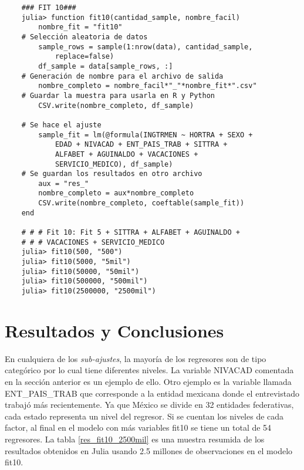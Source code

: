 \begin{verbatim}
	### FIT 10###
	julia> function fit10(cantidad_sample, nombre_facil)
    	nombre_fit = "fit10"
    # Selección aleatoria de datos
    	sample_rows = sample(1:nrow(data), cantidad_sample, 
    		replace=false)
    	df_sample = data[sample_rows, :]
    # Generación de nombre para el archivo de salida
    	nombre_completo = nombre_facil*"_"*nombre_fit*".csv"
    # Guardar la muestra para usarla en R y Python
    	CSV.write(nombre_completo, df_sample)

    # Se hace el ajuste
    	sample_fit = lm(@formula(INGTRMEN ~ HORTRA + SEXO + 
    		EDAD + NIVACAD + ENT_PAIS_TRAB + SITTRA + 
    		ALFABET + AGUINALDO + VACACIONES +
    		SERVICIO_MEDICO), df_sample)
	# Se guardan los resultados en otro archivo
    	aux = "res_"
    	nombre_completo = aux*nombre_completo
    	CSV.write(nombre_completo, coeftable(sample_fit))
	end 

	# # # Fit 10: Fit 5 + SITTRA + ALFABET + AGUINALDO + 
	# # # VACACIONES + SERVICIO_MEDICO
	julia> fit10(500, "500")
	julia> fit10(5000, "5mil")
	julia> fit10(50000, "50mil")
	julia> fit10(500000, "500mil")
	julia> fit10(2500000, "2500mil")

\end{verbatim}

\section{Resultados y Conclusiones}

En cualquiera de los \textit{sub-ajustes}, la mayoría de los regresores son de tipo categórico por lo cual tiene diferentes niveles. La variable \textsf{NIVACAD} comentada en la sección anterior es un ejemplo de ello. Otro ejemplo es la variable llamada \textsf{ENT\_PAIS\_TRAB} que corresponde a la entidad mexicana donde el entrevistado trabajó más recientemente. Ya que México se divide en 32 entidades federativas, cada estado representa un nivel del regresor.  Si se cuentan los niveles de cada factor, al final en el modelo con más variables \textsf{fit10} se tiene un total de 54 regresores. La tabla \ref{res_fit10_2500mil} es una muestra resumida de los resultados obtenidos en \textsf{Julia} usando 2.5 millones de observaciones en el modelo \textsf{fit10}.  


